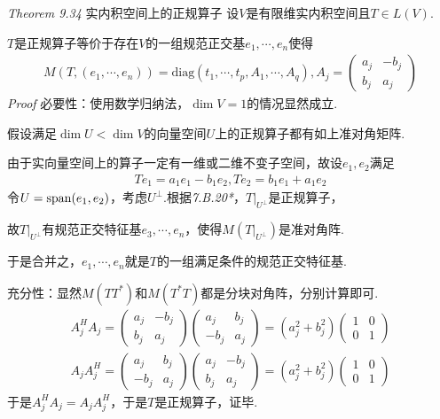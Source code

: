 \textit{Theorem 9.34} {\kaishu 实内积空间上的正规算子}
设\(V\)是有限维实内积空间且\(T \in L(V)\).

\(T\)是正规算子等价于存在\(V\)的一组规范正交基\(e_1,\cdots,e_n\)使得
    \begin{align*}
        M(T,(e_1,\cdots,e_n))=\mathrm{diag}(t_1,\cdots,t_p,A_1,\cdots,A_q),A_j=
        \begin{pmatrix}
            a_j & -b_j \\
            b_j & a_j
        \end{pmatrix}
    \end{align*}
\textit{Proof}
必要性：使用数学归纳法，\(\dim V=1\)的情况显然成立.

假设满足\(\dim U<\dim V\)的向量空间\(U\)上的正规算子都有如上准对角矩阵.

由于实向量空间上的算子一定有一维或二维不变子空间，故设\(e_1,e_2\)满足
    \begin{align*}
        Te_1=a_1e_1-b_1e_2,Te_2=b_1e_1+a_1e_2
    \end{align*}
令\(U=\mathrm{span}(e_1,e_2)\)，考虑\(U^\bot\).根据\textit{7.B.20*}，\(T|_{U^\bot}\)是正规算子，

故\(T|_{U^\bot}\)有规范正交特征基\(e_3,\cdots,e_n\)，使得\(M(T|_{U^\bot})\)是准对角阵.

于是合并之，\(e_1,\cdots,e_n\)就是\(T\)的一组满足条件的规范正交特征基.

充分性：显然\(M(TT^*)\)和\(M(T^*T)\)都是分块对角阵，分别计算即可.
    \begin{align*}
        A_j^H A_j=
        \begin{pmatrix}
            a_j & -b_j \\
            b_j & a_j
        \end{pmatrix}
        \begin{pmatrix}
             a_j & b_j \\
            -b_j & a_j
        \end{pmatrix}
        =(a_j^2+b_j^2)
        \begin{pmatrix}
            1 & 0 \\
            0 & 1
        \end{pmatrix} \\
        A_j A_j^H=
        \begin{pmatrix}
             a_j & b_j \\
            -b_j & a_j
        \end{pmatrix}
        \begin{pmatrix}
            a_j & -b_j \\
            b_j & a_j
        \end{pmatrix}
        =(a_j^2+b_j^2)
        \begin{pmatrix}
            1 & 0 \\
            0 & 1
        \end{pmatrix}
    \end{align*}
于是\(A_j^H A_j=A_j A_j^H\)，于是\(T\)是正规算子，证毕.

